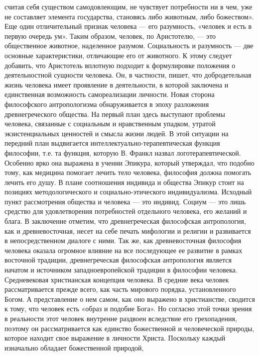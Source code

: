 \documentclass[12pt]{article}
\begin{document}
считая  себя  существом  самодовлеющим,  не  чувствует  потребности  ни  в  чем,  уже  не  составляет  элемента
государства, становясь либо животным, либо божеством».
Еще один отличительный признак человека — его разумность, «человек и есть в первую очередь ум». Таким
образом,  человек,  по  Аристотелю,  —  это  общественное  животное,  наделенное  разумом.  Социальность  и
разумность — две основные характеристики, отличающие его от животного.
К этому следует добавить, что Аристотель вплотную подходит к формулировке положения о деятельностной
сущности  человека.  Он,  в  частности,  пишет,  что  добродетельная  жизнь  человека  имеет  проявление  в
деятельности, в которой заключена и единственная возможность самореализации личности.
Новая сторона философского антропологизма обнаруживается в эпоху разложения древнегреческого общества.
На  первый  план  здесь  выступают  проблемы  человека,  связанные  с  социальным  и  нравственным  упадком,
утратой экзистенциальных ценностей и смысла жизни людей. В этой ситуации на передний план выдвигается
интеллектуально-терапевтическая  функция  философии,  т.е.  та  функция,  которую  В.  Франкл  назвал
логотерапевтической. Особенно ярко она выражена в учении Эпикура, который утверждал, что подобно тому,
как  медицина  помогает  лечить  тело  человека,  философия  должна  помогать  лечить  его  душу.  В  плане
соотношения  индивида  и  общества  Эпикур  стоит  на  позициях  методологического  и  социально-этического
индивидуализма. Исходный пункт рассмотрения общества и человека — это индивид. Социум — это лишь
средство для удовлетворения потребностей отдельного человека, его желаний и блага.
В заключение отметим, что древнегреческая философская антропология, как и древневосточная, несет на себе
печать мифологии и религии и развивается в непосредственном диалоге с ними.
Так же, как древневосточная философия человека оказала огромное влияние на все последующее ее развитие в
рамках  восточной  традиции,  древнегреческая  философская  антропология  является  начатом  и  источником
западноевропейской традиции в философии человека.
Средневековая христианская концепция человека.
В средние века человек рассматривается прежде всего, как часть мирового порядка, установленного Богом. А
представление о нем самом, как оно выражено в христианстве, сводится к тому, что человек есть «образ и
подобие Бога». Но согласно этой точки зрения в реальности этот человек внутренне раздвоен вследствие его
грехопадения,  поэтому  он  рассматривается  как  единство  божественной  и  человеческой  природы,  которое 
находит свое выражение в личности Христа. Поскольку каждый изначально обладает божественной природой,
\end{document}
